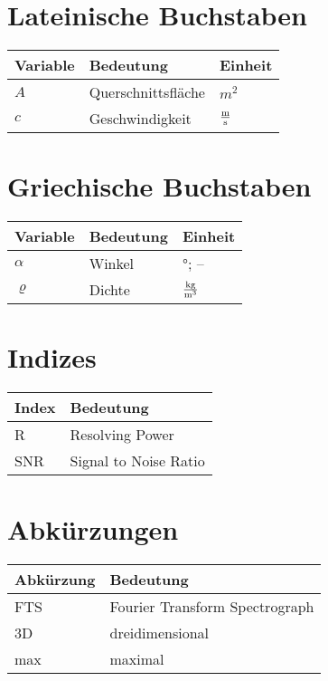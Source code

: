 \documentclass[master,       %
               twoside,        %
               BCOR10mm,       %
               ngerman,english  %
               ]{GAUBM_astro}
\newcommand{\tabheadfont}[1]{\textbf{#1}} %
\begin{document}
\begin{nomenclature}
\section*{Lateinische Buchstaben}
\noindent
\begin{longtable}[l]{p{}p{}p{}}
  \tabheadfont{Variable}&\tabheadfont{Bedeutung}&\tabheadfont{Einheit}\\\midrule\endhead
  $A$ & Querschnittsfl\"ache & $\unit{m^2}$\\
  $c$ & Geschwindigkeit & $\unitfrac{m}{s}$
\end{longtable}
\section*{Griechische Buchstaben}
\begin{longtable}[l]{p{}p{}p{}}
  \tabheadfont{Variable}&\tabheadfont{Bedeutung}&\tabheadfont{Einheit}\\\midrule\endhead
  $\alpha$  & Winkel & $\unit{\degree}$; --\\
  $\varrho$ & Dichte & $\unitfrac{kg}{m^3}$
\end{longtable}
\section*{Indizes}
\begin{longtable}[l]{p{}p{}}
  \tabheadfont{Index}&\tabheadfont{Bedeutung}\\\midrule\endhead
  R & Resolving Power\\
  SNR & Signal to Noise Ratio
\end{longtable}
\section*{Abk\"urzungen}
\begin{longtable}[l]{p{}p{}}
  \tabheadfont{Abk\"urzung}&\tabheadfont{Bedeutung}\\\midrule\endhead
  FTS & Fourier Transform Spectrograph\\
  3D & dreidimensional\\
  max & maximal
\end{longtable}
\end{nomenclature}
\end{document}
